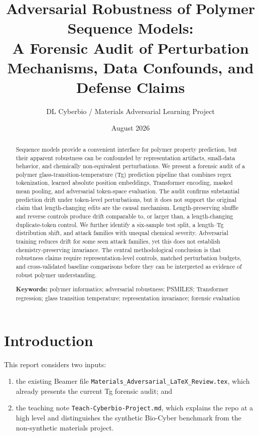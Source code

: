 \documentclass[11pt]{article}
\title{Adversarial Robustness of Polymer Sequence Models:\\
\large A Forensic Audit of Perturbation Mechanisms, Data Confounds, and Defense Claims}
\author[1]{DL Cyberbio / Materials Adversarial Learning Project}
\affil[1]{Repository-grounded technical manuscript}
\date{August 2026}
\begin{document}
\maketitle

\begin{abstract}
Sequence models provide a convenient interface for polymer property prediction,
but their apparent robustness can be confounded by representation artifacts,
small-data behavior, and chemically non-equivalent perturbations. We present a
forensic audit of a polymer glass-transition-temperature (Tg) prediction
pipeline that combines regex tokenization, learned absolute position embeddings,
Transformer encoding, masked mean pooling, and adversarial token-space
evaluation. The audit confirms substantial prediction drift under token-level
perturbations, but it does not support the original claim that length-changing
edits are the causal mechanism. Length-preserving shuffle and reverse controls
produce drift comparable to, or larger than, a length-changing duplicate-token
control. We further identify a six-sample test split, a length--Tg distribution
shift, and attack families with unequal chemical severity. Adversarial training
reduces drift for some seen attack families, yet this does not establish
chemistry-preserving invariance. The central methodological conclusion is that
robustness claims require representation-level controls, matched perturbation
budgets, and cross-validated baseline comparisons before they can be interpreted
as evidence of robust polymer understanding.

\noindent\textbf{Keywords:} polymer informatics; adversarial robustness; PSMILES;
Transformer regression; glass transition temperature; representation invariance;
forensic evaluation
\end{abstract}

\section{Introduction}

This report considers two inputs:
\begin{enumerate}
  \item the existing Beamer file \texttt{Materials\_Adversarial\_LaTeX\_Review.tex}, which already presents the current Tg forensic audit; and
  \item the teaching note \texttt{Teach-Cyberbio-Project.md}, which explains the repo at a high level and distinguishes the synthetic Bio-Cyber benchmark from the non-synthetic materials project.
\end{enumerate}
\end{document}
